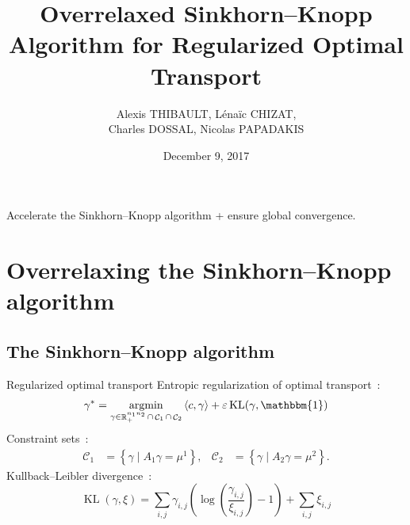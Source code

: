 \documentclass[compress]{beamer}
\title[Overrelaxed SK Algorithm]{Overrelaxed Sinkhorn--Knopp Algorithm for Regularized Optimal Transport}
\author[A. THIBAULT]{
	Alexis THIBAULT, 
	L\'ena\"ic CHIZAT,\\
	Charles DOSSAL,
	Nicolas PAPADAKIS
}
\institute[OTML'17]{Optimal Transport and Machine Learning workshop \\ NIPS 2017}
\date{December 9, 2017}
\newcommand{\scal}[2]{\left\langle #1 , #2 \right\rangle}
\DeclareMathOperator{\IR}{\mathbb{R}}
\DeclareMathOperator*{\argmin}{argmin}
\DeclareMathOperator{\One}{\mathbbm{1}}
\DeclareMathOperator{\Ccal}{\mathcal{C}}
\DeclareMathOperator{\KL}{KL}
\renewcommand{\epsilon}{\varepsilon}
\begin{document}
\titlepage

\begin{frame}
Accelerate the Sinkhorn--Knopp algorithm + ensure global convergence.
\tableofcontents
\end{frame}

\section[Overrelaxing SK]{Overrelaxing the Sinkhorn--Knopp algorithm}

\subsection[SK algorithm]{The Sinkhorn--Knopp algorithm}
\begin{frame}{Regularized optimal transport}
Entropic regularization of optimal transport~:
\begin{equation} \label{eq:problem}
\gamma^* = \argmin_{\gamma \in \IR^{n_1 n_2}_+ \cap \Ccal_1 \cap \Ccal_2}
	\scal{c}{\gamma} + \epsilon \KL(\gamma,\One)
\end{equation}
\pause
Constraint sets~:
\begin{align*}
\Ccal_1 &= \left\{ \gamma \mid A_1 \gamma = \mu^1 \right\},
&
\Ccal_2 &= \left\{ \gamma \mid A_2 \gamma = \mu^2 \right\}.
\end{align*}
\pause
Kullback--Leibler divergence~:
\begin{equation*}\label{KL}
\KL(\gamma,\xi) = \sum_{i,j} \gamma_{i,j} \left( \log \left( \frac{\gamma_{i,j}}{\xi_{i,j}} \right) -1  \right) + \sum_{i,j} \xi_{i,j}
\end{equation*}
\end{frame}
\end{document}
